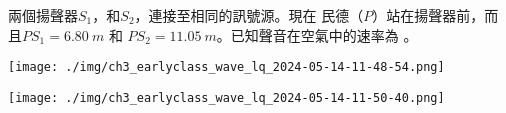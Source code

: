 {
    兩個揚聲器$S_1$，和$S_2$，連接至相同的訊號源。現在 民德（$P$）站在揚聲器前，而且$PS_1=\qty{6.80}{m}$ 和 $PS_2= \qty{11.05}{m} $。已知聲音在空氣中的速率為 。
    \par{\par\centering\texttt{[image: ./img/ch3\_earlyclass\_wave\_lq\_2024-05-14-11-48-54.png]}\par}
}{
    \sol\par{\par\centering\texttt{[image: ./img/ch3\_earlyclass\_wave\_lq\_2024-05-14-11-50-40.png]}\par}
}


